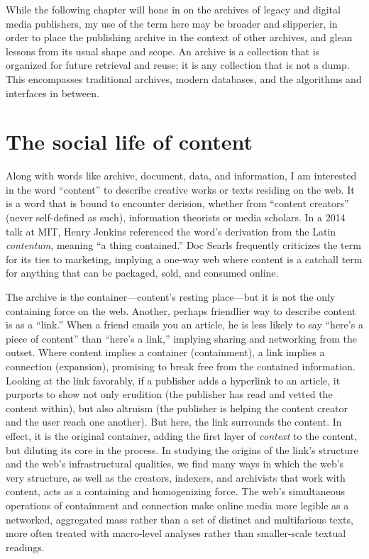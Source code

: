 While the following chapter will hone in on the archives of legacy and digital media publishers, my use of the term here may be broader and slipperier, in order to place the publishing archive in the context of other archives, and glean lessons from its usual shape and scope. An archive is a collection that is organized for future retrieval and reuse; it is any collection that is not a dump. This encompasses traditional archives, modern databases, and the algorithms and interfaces in between.

\section{The social life of content}

Along with words like archive, document, data, and information, I am interested in the word ``content'' to describe creative works or texts residing on the web. It is a word that is bound to encounter derision, whether from ``content creators'' (never self-defined as such), information theorists or media scholars. In a 2014 talk at MIT, Henry Jenkins referenced the word's derivation from the Latin \emph{contentum}, meaning ``a thing contained.''\autocite{whitacre_henry_????} Doc Searls frequently criticizes the term for its ties to marketing, implying a one-way web where content is a catchall term for anything that can be packaged, sold, and consumed online.\autocite{searls_earth_2014}

The archive is the container---content's resting place---but it is not the only containing force on the web. Another, perhaps friendlier way to describe content is as a ``link.'' When a friend emails you an article, he is less likely to say ``here's a piece of content'' than ``here's a link,'' implying sharing and networking from the outset. Where content implies a container (containment), a link implies a connection (expansion), promising to break free from the contained information. Looking at the link favorably, if a publisher adds a hyperlink to an article, it purports to show not only erudition (the publisher has read and vetted the content within), but also altruism (the publisher is helping the content creator and the user reach one another). But here, the link surrounds the content. In effect, it is the original container, adding the first layer of \emph{context} to the content, but diluting its core in the process. In studying the origins of the link's structure and the web's infrastructural qualities, we find many ways in which the web's very structure, as well as the creators, indexers, and archivists that work with content, acts as a containing and homogenizing force. The web's simultaneous operations of containment and connection make online media more legible as a networked, aggregated mass rather than a set of distinct and multifarious texts, more often treated with macro-level analyses rather than smaller-scale textual readings.

